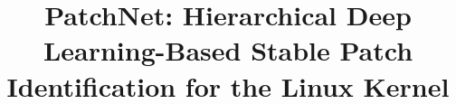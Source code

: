 \documentclass[conference]{IEEEtran}
\begin{document}
\title{PatchNet: Hierarchical Deep Learning-Based Stable Patch Identification for the Linux Kernel}
%

\maketitle









\balance

 
\end{document}
